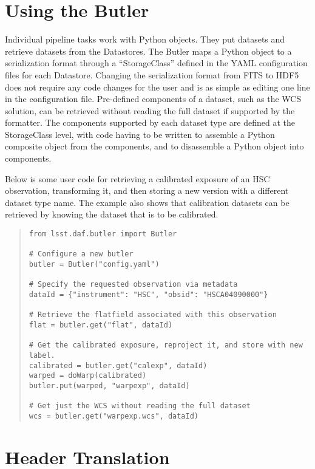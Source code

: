 \documentclass[11pt,twoside]{article}
\begin{document}
\section{Using the Butler}
\label{sec:using}

Individual pipeline tasks work with Python objects.
They put datasets and retrieve datasets from the Datastores.
The Butler maps a Python object  to  a serialization format through a ``StorageClass'' defined in the YAML configuration files for each Datastore.
Changing the serialization format from FITS to HDF5 does not require any code changes for the user and is as simple as editing one line in the configuration file.
Pre-defined components of a dataset, such as the WCS solution, can be retrieved without reading the full dataset if supported by the formatter.
The components supported by each dataset type are defined at the StorageClass level, with code having to be written to assemble a Python composite object from the components, and to disassemble a Python object into components.

Below is some user code for retrieving a calibrated exposure of an HSC observation, transforming it, and then storing a new version with a different dataset type name.
The example also shows that calibration datasets can be retrieved by knowing the dataset that is to be calibrated.

\begin{quote}
\begin{small}
\begin{verbatim}
from lsst.daf.butler import Butler

# Configure a new butler
butler = Butler("config.yaml")

# Specify the requested observation via metadata
dataId = {"instrument": "HSC", "obsid": "HSCA04090000"}

# Retrieve the flatfield associated with this observation
flat = butler.get("flat", dataId)

# Get the calibrated exposure, reproject it, and store with new label.
calibrated = butler.get("calexp", dataId)
warped = doWarp(calibrated)
butler.put(warped, "warpexp", dataId)

# Get just the WCS without reading the full dataset
wcs = butler.get("warpexp.wcs", dataId)
\end{verbatim}
\end{small}
\end{quote}

\section{Header Translation}
\end{document}
